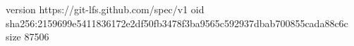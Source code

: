 version https://git-lfs.github.com/spec/v1
oid sha256:2159699e5411836172e2df50fb3478f3ba9565c592937dbab700855cada88c6c
size 87506
